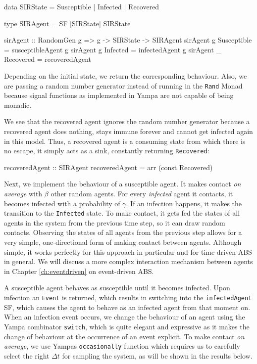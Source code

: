 \begin{HaskellCode}
data SIRState = Susceptible | Infected | Recovered

type SIRAgent = SF [SIRState] SIRState 

sirAgent :: RandomGen g => g -> SIRState -> SIRAgent
sirAgent g Susceptible = susceptibleAgent g
sirAgent g Infected    = infectedAgent g
sirAgent _ Recovered   = recoveredAgent
\end{HaskellCode}

Depending on the initial state, we return the corresponding behaviour. Also, we are passing a random number generator instead of running in the \texttt{Rand} Monad because signal functions as implemented in Yampa are not capable of being monadic. 

We see that the recovered agent ignores the random number generator because a recovered agent does nothing, stays immune forever and cannot get infected again in this model. Thus, a recovered agent is a consuming state from which there is no escape, it simply acts as a sink, constantly returning \texttt{Recovered}:

\begin{HaskellCode}
recoveredAgent :: SIRAgent
recoveredAgent = arr (const Recovered)
\end{HaskellCode}

Next, we implement the behaviour of a susceptible agent. It makes contact \textit{on average} with $\beta$ other random agents. For every \textit{infected} agent it contacts, it becomes infected with a probability of $\gamma$. If an infection happens, it makes the transition to the \texttt{Infected} state. To make contact, it gets fed the states of all agents in the system from the previous time step, so it can draw random contacts. Observing the states of all agents from the previous step allows for a very simple, one-directional form of making contact between agents. Although simple, it works perfectly for this approach in particular and for time-driven ABS in general. We will discuss a more complex interaction mechanism between agents in Chapter \ref{ch:eventdriven} on event-driven ABS.

A susceptible agent behaves as susceptible until it becomes infected. Upon infection an \texttt{Event} is returned, which results in switching into the \texttt{infectedAgent} SF, which causes the agent to behave as an infected agent from that moment on. When an infection event occurs, we change the behaviour of an agent using the Yampa combinator \texttt{switch}, which is quite elegant and expressive as it makes the change of behaviour at the occurrence of an event explicit. To make contact \textit{on average}, we use Yampas \texttt{occasionally} function which requires us to carefully select the right $\Delta t$ for sampling the system, as will be shown in the results below. 

